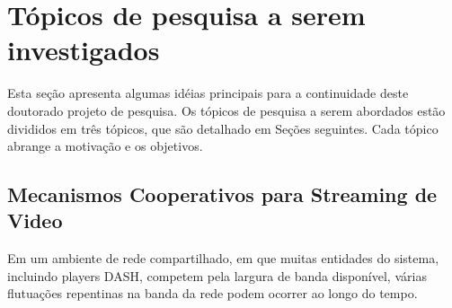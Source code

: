 \clearpage
\section{Tópicos de pesquisa a serem investigados}
\label{ch:proposal}

Esta seção apresenta algumas idéias principais para a continuidade deste doutorado
projeto de pesquisa. Os tópicos de pesquisa a serem abordados estão divididos em três tópicos, que são
detalhado em Seções seguintes.
Cada tópico abrange a motivação e os objetivos.



\subsection{Mecanismos Cooperativos para Streaming de Video}
\label{subsec:video-streaming}


Em um ambiente de rede compartilhado, em que muitas entidades do sistema, incluindo players DASH, competem pela largura de banda disponível, várias flutuações repentinas na banda da rede podem ocorrer ao longo do tempo.

